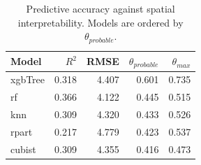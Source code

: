 \begin{table}[htbp]
\centering
\caption{Predictive accuracy against spatial interpretability. Models are ordered by $\theta_{probable}$.}
\label{tab:accuracy-vs-dsi}
\begin{tabular}{lrrrr}
\hline
\textbf{Model} & \textbf{$R^2$} & \textbf{RMSE} & \textbf{$\theta_{probable}$} & \textbf{$\theta_{max}$} \\
\hline
xgbTree & 0.318 & 4.407 & 0.601 & 0.735 \\
rf & 0.366 & 4.122 & 0.445 & 0.515 \\
knn & 0.309 & 4.320 & 0.433 & 0.526 \\
rpart & 0.217 & 4.779 & 0.423 & 0.537 \\
cubist & 0.309 & 4.355 & 0.416 & 0.473 \\
\hline
\end{tabular}
\end{table}
